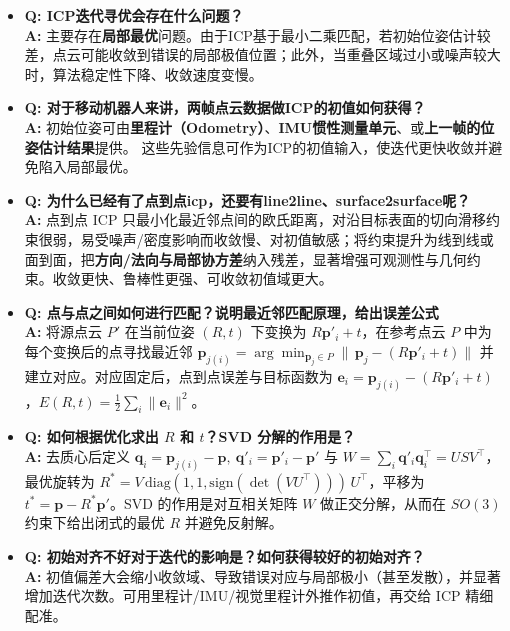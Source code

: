 \documentclass[../main.tex]{subfiles}
\begin{document}
\begin{enumerate}
\begin{itemize}
\begin{itemize}
        
            \item \textbf{Q: ICP迭代寻优会存在什么问题？} \\
            \textbf{A:} 主要存在\textbf{局部最优}问题。由于ICP基于最小二乘匹配，若初始位姿估计较差，点云可能收敛到错误的局部极值位置；此外，当重叠区域过小或噪声较大时，算法稳定性下降、收敛速度变慢。
        
            \item \textbf{Q: 对于移动机器人来讲，两帧点云数据做ICP的初值如何获得？} \\
            \textbf{A:} 初始位姿可由\textbf{里程计（Odometry）}、\textbf{IMU惯性测量单元}、或\textbf{上一帧的位姿估计结果}提供。  
            这些先验信息可作为ICP的初值输入，使迭代更快收敛并避免陷入局部最优。

            \item \textbf{Q: 为什么已经有了点到点icp，还要有line2line、surface2surface呢？}\\
            \textbf{A:} 点到点 ICP 只最小化最近邻点间的欧氏距离，对沿目标表面的切向滑移约束很弱，易受噪声/密度影响而收敛慢、对初值敏感；将约束提升为线到线或面到面，把\textbf{方向/法向与局部协方差}纳入残差，显著增强可观测性与几何约束。收敛更快、鲁棒性更强、可收敛初值域更大。

            \item \textbf{Q: 点与点之间如何进行匹配？说明最近邻匹配原理，给出误差公式}\\
            \textbf{A:} 将源点云 $P'$ 在当前位姿 $(R,t)$ 下变换为 $R\mathbf p'_i+t$，在参考点云 $P$ 中为每个变换后的点寻找最近邻 $\mathbf p_{j(i)}=\arg\min_{\mathbf p_j\in P}\|\,\mathbf p_j-(R\mathbf p'_i+t)\|$ 并建立对应。对应固定后，点到点误差与目标函数为 $\mathbf e_i=\mathbf p_{j(i)}-(R\mathbf p'_i+t)$，$E(R,t)=\tfrac12\sum_i\|\mathbf e_i\|^2$。
            
            \item \textbf{Q: 如何根据优化求出 $R$ 和 $t$？SVD 分解的作用是？}\\
            \textbf{A:} 去质心后定义 $\mathbf q_i=\mathbf p_{j(i)}-\mathbf p,\ \mathbf q'_i=\mathbf p'_i-\mathbf p'$ 与 $W=\sum_i \mathbf q'_i\mathbf q_i^\top=USV^\top$，最优旋转为 $R^*=V\,\mathrm{diag}(1,1,\mathrm{sign}(\det(VU^\top)))\,U^\top$，平移为 $t^*=\mathbf p-R^*\mathbf p'$。SVD 的作用是对互相关矩阵 $W$ 做正交分解，从而在 $SO(3)$ 约束下给出闭式的最优 $R$ 并避免反射解。
            
            \item \textbf{Q: 初始对齐不好对于迭代的影响是？如何获得较好的初始对齐？}\\
            \textbf{A:} 初值偏差大会缩小收敛域、导致错误对应与局部极小（甚至发散），并显著增加迭代次数。可用里程计/IMU/视觉里程计外推作初值，再交给 ICP 精细配准。


\end{itemize}
\end{itemize}
\end{enumerate}
\end{document}
